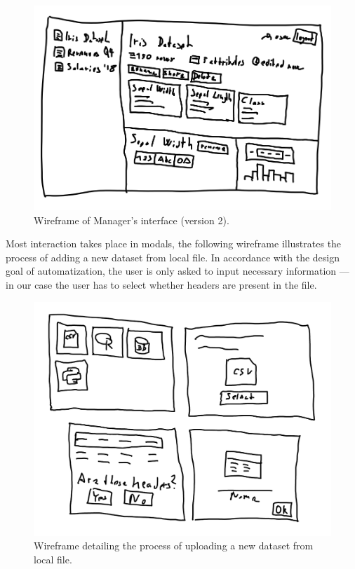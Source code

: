 \documentclass[thesis=M,english,hidelinks]{FITthesisXE}[2012/06/26]
\begin{document}
\begin{figure}[ht]
\centering
\includegraphics[scale=0.2]{wireframe_dataset2}
\caption{Wireframe of Manager's interface (version 2).}
\label{fig:wireframe_dataset2}
\end{figure}

Most interaction takes place in modals, the following wireframe illustrates the process of adding a new dataset from local file. In accordance with the design goal of automatization, the user is only asked to input necessary information --- in our case the user has to select whether headers are present in the file.

\begin{figure}[ht]
\centering
\includegraphics[scale=0.2]{wireframe_upload}
\caption{Wireframe detailing the process of uploading a new dataset from local file.}
\label{fig:wireframe_upload}
\end{figure}
\end{document}
